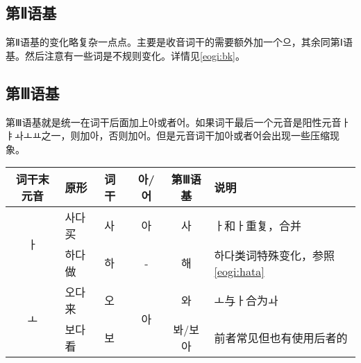 \subsection{第Ⅱ语基}
第Ⅱ语基的变化略复杂一点点。主要是收音词干的需要额外加一个으，其余同第Ⅰ语基。然后注意有一些词是不规则变化。详情见\ref{eogi:bk}。
\subsection{第Ⅲ语基}
第Ⅲ语基就是统一在词干后面加上아或者어。如果词干最后一个元音是阳性元音ㅏㅑㅘㅗㅛ之一，则加아，否则加어。但是元音词干加아或者어会出现一些压缩现象。\\
\begin{tabular}{|c|l|l|c|c|l|}
    \hline
    词干末元音&原形&词干&아/어&第Ⅲ语基&说明\\\hline
    \multirow{2}{*}{ㅏ}&사다 买&사&아&사&ㅏ和ㅏ重复，合并\\\cline{2-6}
    &하다 做&하&-&해&하다类词特殊变化，参照\ref{eogi:hata}\\\hline
    \multirow{2}{*}{ㅗ}&오다 来&오&\multirow{2}{*}{아}&와&ㅗ与ㅏ合为ㅘ\\\cline{2-3}\cline{5-6}
    &보다 看&보&&봐/보아&前者常见但也有使用后者的\\\hline
\end{tabular}\\

